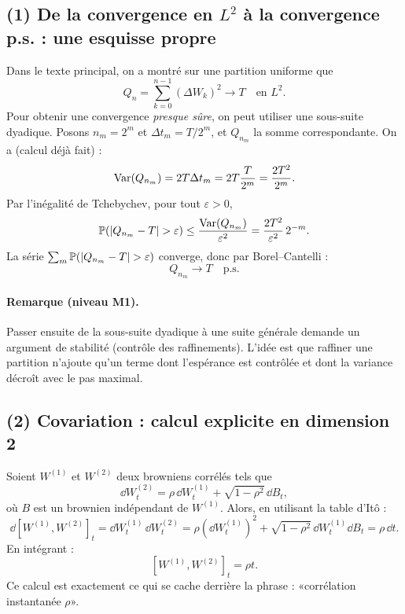
\subsection*{(1) De la convergence en $L^2$ à la convergence p.s. : une esquisse propre}
Dans le texte principal, on a montré sur une partition uniforme que
\[
Q_n=\sum_{k=0}^{n-1}(\Delta W_k)^2 \to T \quad \text{en }L^2.
\]
Pour obtenir une convergence \emph{presque sûre}, on peut utiliser une sous-suite dyadique.
Posons $n_m=2^m$ et $\Delta t_m=T/2^m$, et $Q_{n_m}$ la somme correspondante.
On a (calcul déjà fait) :
\[
\mathrm{Var}(Q_{n_m})=2T\Delta t_m = 2T\frac{T}{2^m}=\frac{2T^2}{2^m}.
\]
Par l'inégalité de Tchebychev, pour tout $\varepsilon>0$,
\[
\Prob(|Q_{n_m}-T|>\varepsilon)\le \frac{\Var(Q_{n_m})}{\varepsilon^2}
=\frac{2T^2}{\varepsilon^2}\,2^{-m}.
\]
La série $\sum_m \Prob(|Q_{n_m}-T|>\varepsilon)$ converge, donc par Borel--Cantelli :
\[
Q_{n_m}\to T \quad \text{p.s.}
\]
\paragraph{Remarque (niveau M1).}
Passer ensuite de la sous-suite dyadique à une suite générale demande un argument de stabilité (contrôle des raffinements). L'idée est que raffiner une partition n'ajoute qu'un terme dont l'espérance est contrôlée et dont la variance décroît avec le pas maximal.

\subsection*{(2) Covariation : calcul explicite en dimension 2}
Soient $W^{(1)}$ et $W^{(2)}$ deux browniens corrélés tels que
\[
\dd W_t^{(2)}=\rho\,\dd W_t^{(1)}+\sqrt{1-\rho^2}\,\dd B_t,
\]
où $B$ est un brownien indépendant de $W^{(1)}$.
Alors, en utilisant la table d'Itô :
\[
\dd[W^{(1)},W^{(2)}]_t=\dd W_t^{(1)}\,\dd W_t^{(2)}
=\rho(\dd W_t^{(1)})^2+\sqrt{1-\rho^2}\,\dd W_t^{(1)}\dd B_t
=\rho\,\dd t.
\]
En intégrant :
\[
\boxed{[W^{(1)},W^{(2)}]_t=\rho t.}
\]
Ce calcul est exactement ce qui se cache derrière la phrase : «corrélation instantanée $\rho$».

